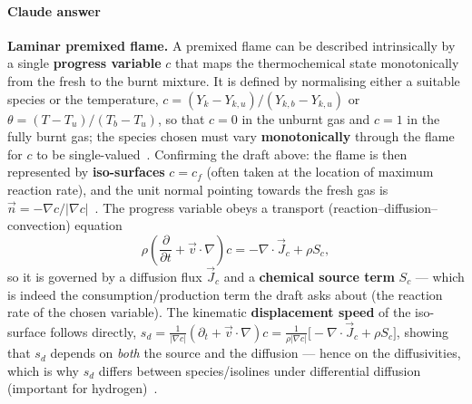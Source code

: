 {\color{istblue}
\paragraph{Claude answer}
\textbf{Laminar premixed flame.} A premixed flame can be described intrinsically by a single \textbf{progress variable} $c$ that maps the thermochemical state monotonically from the fresh to the burnt mixture. It is defined by normalising either a suitable species or the temperature, $c = (Y_k - Y_{k,u})/(Y_{k,b}-Y_{k,u})$ or $\theta = (T-T_u)/(T_b-T_u)$, so that $c=0$ in the unburnt gas and $c=1$ in the fully burnt gas; the species chosen must vary \textbf{monotonically} through the flame for $c$ to be single-valued~\cite{lecture9,warnatz2006combustion}. Confirming the draft above: the flame is then represented by \textbf{iso-surfaces} $c=c_f$ (often taken at the location of maximum reaction rate), and the unit normal pointing towards the fresh gas is $\vec n = -\nabla c/|\nabla c|$~\cite{lecture9}. The progress variable obeys a transport (reaction--diffusion--convection) equation
\begin{equation*}
\rho\left(\frac{\partial}{\partial t} + \vec v\cdot\nabla\right)c = -\nabla\cdot \vec J_c + \rho S_c,
\end{equation*}
so it is governed by a diffusion flux $\vec J_c$ and a \textbf{chemical source term} $S_c$ --- which is indeed the consumption/production term the draft asks about (the reaction rate of the chosen variable). The kinematic \textbf{displacement speed} of the iso-surface follows directly, $s_d = \tfrac{1}{|\nabla c|}(\partial_t + \vec v\cdot\nabla)c = \tfrac{1}{\rho|\nabla c|}\big[-\nabla\cdot\vec J_c + \rho S_c\big]$, showing that $s_d$ depends on \emph{both} the source and the diffusion --- hence on the diffusivities, which is why $s_d$ differs between species/isolines under differential diffusion (important for hydrogen)~\cite{lecture9}.

}
